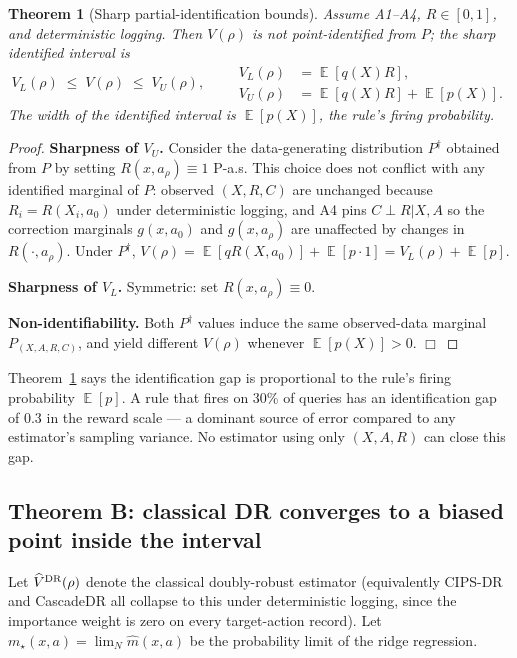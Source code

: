 \documentclass[11pt]{article}
\newtheorem{theorem}{Theorem}
\DeclareMathOperator{\E}{\mathbb{E}}
\begin{document}
\begin{theorem}[Sharp partial-identification bounds]
\label{thm:partial-id}
Assume A1--A4, $R \in [0, 1]$, and deterministic logging.  Then $V(\rho)$
is \emph{not} point-identified from $P$; the sharp identified interval
is
\begin{equation}
V_L(\rho) \;\le\; V(\rho) \;\le\; V_U(\rho), \qquad
\begin{aligned}
V_L(\rho) &= \E[q(X) R], \\
V_U(\rho) &= \E[q(X) R] + \E[p(X)].
\end{aligned}
\label{eq:sharp-bounds}
\end{equation}
The width of the identified interval is $\E[p(X)]$, the rule's firing probability.
\end{theorem}
\begin{proof}
\textbf{Sharpness of $V_U$.}  Consider the data-generating distribution
$P^\dagger$ obtained from $P$ by setting $R(x, a_\rho) \equiv 1$ P-a.s.
This choice does not conflict with any identified marginal of $P$:
observed $(X, R, C)$ are unchanged because $R_i = R(X_i, a_0)$ under
deterministic logging, and A4 pins $C \perp R | X, A$ so the correction
marginals $g(x, a_0)$ and $g(x, a_\rho)$ are unaffected by changes in
$R(\cdot, a_\rho)$.  Under $P^\dagger$, $V(\rho) = \E[q R(X, a_0)] + \E[p \cdot 1] = V_L(\rho) + \E[p]$.

\textbf{Sharpness of $V_L$.}  Symmetric: set $R(x, a_\rho) \equiv 0$.

\textbf{Non-identifiability.}  Both $P^\dagger$ values induce the same
observed-data marginal $P_{(X, A, R, C)}$, and yield different $V(\rho)$
whenever $\E[p(X)] > 0$.  $\Box$
\end{proof}

\begin{remark}
Theorem~\ref{thm:partial-id} says the identification gap is proportional
to the rule's firing probability $\E[p]$.  A rule that fires on 30\% of
queries has an identification gap of $0.3$ in the reward scale --- a
dominant source of error compared to any estimator's sampling variance.
No estimator using only $(X, A, R)$ can close this gap.
\end{remark}

\subsection{Theorem B: classical DR converges to a biased point inside the interval}

Let $\widehat V^{\rm DR}(\rho)$ denote the classical doubly-robust
estimator (equivalently CIPS-DR and CascadeDR all collapse to this under
deterministic logging, since the importance weight is zero on every
target-action record).  Let $m_\star(x, a) = \lim_N \widehat m(x, a)$
be the probability limit of the ridge regression.
\end{document}
